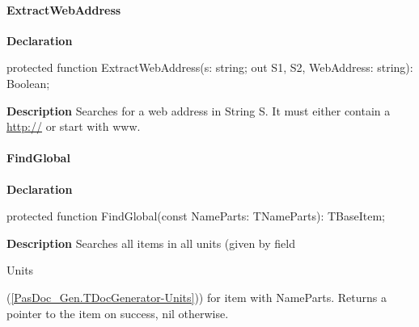 \documentclass{report}
\newif\ifpdf
\begin{document}
\paragraph*{ExtractWebAddress}\hspace*{\fill}

\label{PasDoc_Gen.TDocGenerator-ExtractWebAddress}
\begin{list}{}{
\setlength{\itemindent}{0cm}
\setlength{\listparindent}{0cm}
\setlength{\leftmargin}{\evensidemargin}
\addtolength{\leftmargin}{\tmplength}
\settowidth{\labelsep}{X}
\addtolength{\leftmargin}{\labelsep}
\setlength{\labelwidth}{\tmplength}
}
\item[\textbf{Declaration}\hfill]
\ifpdf
\begin{flushleft}
\fi
\begin{ttfamily}
protected function ExtractWebAddress(s: string; out S1, S2, WebAddress: string): Boolean;\end{ttfamily}

\ifpdf
\end{flushleft}
\fi

\par
\item[\textbf{Description}]
Searches for a web address in String S. It must either contain a \href{http://}{http://} or start with www.

\end{list}
\paragraph*{FindGlobal}\hspace*{\fill}

\label{PasDoc_Gen.TDocGenerator-FindGlobal}
\begin{list}{}{
\setlength{\itemindent}{0cm}
\setlength{\listparindent}{0cm}
\setlength{\leftmargin}{\evensidemargin}
\addtolength{\leftmargin}{\tmplength}
\settowidth{\labelsep}{X}
\addtolength{\leftmargin}{\labelsep}
\setlength{\labelwidth}{\tmplength}
}
\item[\textbf{Declaration}\hfill]
\ifpdf
\begin{flushleft}
\fi
\begin{ttfamily}
protected function FindGlobal(const NameParts: TNameParts): TBaseItem;\end{ttfamily}

\ifpdf
\end{flushleft}
\fi

\par
\item[\textbf{Description}]
Searches all items in all units (given by field \begin{ttfamily}Units\end{ttfamily}(\ref{PasDoc_Gen.TDocGenerator-Units})) for item with NameParts. Returns a pointer to the item on success, nil otherwise.

\end{list}
\end{document}
